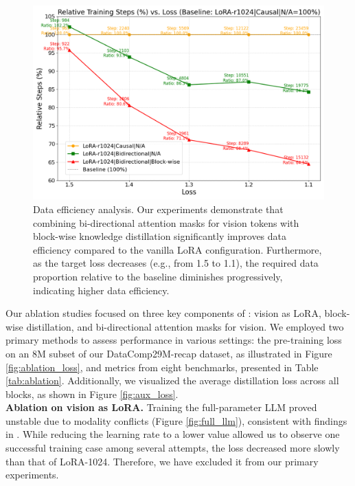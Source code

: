 \begin{figure}
    \centering
    \includegraphics[width=\linewidth]{images/loss_vs_steps.png}
    \caption{Data efficiency analysis. Our experiments demonstrate that combining bi-directional attention masks for vision tokens with block-wise knowledge distillation significantly improves data efficiency compared to the vanilla LoRA configuration. Furthermore, as the target loss decreases (e.g., from 1.5 to 1.1), the required data proportion relative to the baseline diminishes progressively, indicating higher data efficiency.}
    \label{fig:loss_vs_steps}
\end{figure}
Our ablation studies focused on three key components of \model{}: vision as LoRA, block-wise distillation, and bi-directional attention masks for vision. We employed two primary methods to assess performance in various settings: the pre-training loss on an 8M subset of our DataComp29M-recap dataset, as illustrated in Figure \ref{fig:ablation_loss}, and metrics from eight benchmarks, presented in Table \ref{tab:ablation}. Additionally, we visualized the average distillation loss across all blocks, as shown in Figure \ref{fig:aux_loss}.
\\
\textbf{Ablation on vision as LoRA.} Training the full-parameter LLM proved unstable due to modality conflicts (Figure \ref{fig:full_llm}), consistent with findings in \cite{eve}. While reducing the learning rate to a lower value allowed us to observe one successful training case among several attempts, the loss decreased more slowly than that of LoRA-1024. Therefore, we have excluded it from our primary experiments.

